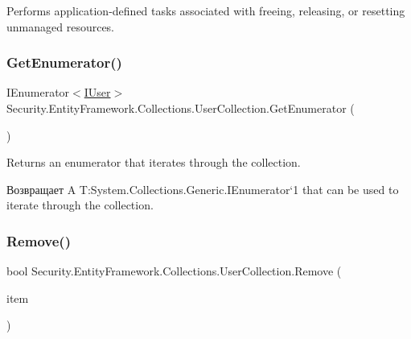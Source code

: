 Performs application-\/defined tasks associated with freeing, releasing, or resetting unmanaged resources. 

\mbox{\label{class_security_1_1_entity_framework_1_1_collections_1_1_user_collection_af3ed40f7651260c4415ad8dbe541a57e}} 
\subsubsection{\texorpdfstring{Get\+Enumerator()}{GetEnumerator()}}
{\footnotesize\ttfamily I\+Enumerator$<$\hyperlink{interface_security_1_1_interfaces_1_1_model_1_1_i_user}{I\+User}$>$ Security.\+Entity\+Framework.\+Collections.\+User\+Collection.\+Get\+Enumerator (\begin{DoxyParamCaption}{ }\end{DoxyParamCaption})}



Returns an enumerator that iterates through the collection. 

\begin{DoxyReturn}{Возвращает}
A T\+:\+System.\+Collections.\+Generic.\+I\+Enumerator`1 that can be used to iterate through the collection. 
\end{DoxyReturn}
\mbox{\label{class_security_1_1_entity_framework_1_1_collections_1_1_user_collection_ad61e980cac9eff5b548e412378b0ae4f}} 
\subsubsection{\texorpdfstring{Remove()}{Remove()}}
{\footnotesize\ttfamily bool Security.\+Entity\+Framework.\+Collections.\+User\+Collection.\+Remove (\begin{DoxyParamCaption}\item[{\hyperlink{interface_security_1_1_interfaces_1_1_model_1_1_i_user}{I\+User}}]{item }\end{DoxyParamCaption})}



